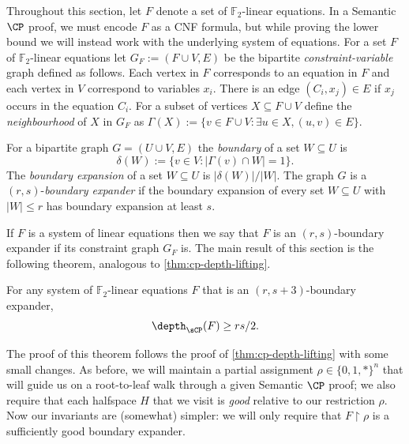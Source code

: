 Throughout this section, let $F$ denote a set of $\mathbb{F}_2$-linear equations.
In a Semantic $\CP$ proof, we must encode $F$ as a CNF formula, but while proving the lower bound we will instead work with the underlying system of equations.
For a set $F$ of $\mathbb{F}_2$-linear equations let $G_F := (F \cup V, E)$ be the bipartite \emph{constraint-variable} graph defined as follows. 
Each vertex in $F$ corresponds to an equation in $F$ and each vertex in $V$ correspond to variables $x_i$. 
There is an edge $(C_i,x_j) \in E$ if $x_j$ occurs in the equation $C_i$.
For a subset of vertices $X \subseteq F \cup V$ define the \emph{neighbourhood} of $X$ in $G_F$ as $\Gamma(X):= \{v \in F \cup V : \exists u \in X, (u,v) \in E\}$.

\begin{definition}\label{def:expansion}
	For a bipartite graph $G=(U \cup V, E)$ the \emph{boundary} of a set $W \subseteq U$ is \[\delta(W):= \{v \in V : |\Gamma(v) \cap W| = 1\}.\]
	The \emph{boundary expansion} of a set $W \subseteq U$ is $|\delta(W)|/|W|$. 
	The graph $G$ is a $(r, s)$-\emph{boundary expander} if the boundary expansion of every set $W \subseteq U$ with $|W| \leq r$ has boundary expansion at least $s$.
\end{definition}

If $F$ is a system of linear equations then we say that $F$ is an $(r,s)$-boundary expander if its constraint graph $G_{F}$ is.
The main result of this section is the following theorem, analogous to \autoref{thm:cp-depth-lifting}.

\begin{theorem}\label{thm:expander-lb}
	For any system of $\mathbb{F}_2$-linear equations $F$ that is an $(r, s+3)$-boundary expander, \[\depth_{\sCP}(F) \geq rs/2.\]
\end{theorem}

The proof of this theorem follows the proof of \autoref{thm:cp-depth-lifting} with some small changes.
As before, we will maintain a partial assignment $\rho \in \{0,1,*\}^n$ that will guide us on a root-to-leaf walk through a given Semantic $\CP$ proof; we also require that each halfspace $H$ that we visit is \emph{good} relative to our restriction $\rho$.
Now our invariants are (somewhat) simpler: we will only require that $F \restriction \rho$ is a sufficiently good boundary expander.

